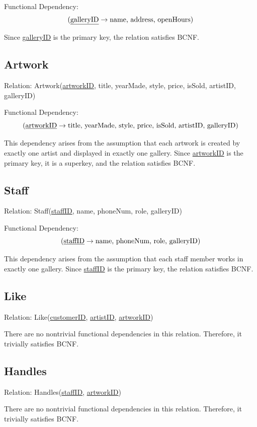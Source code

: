 \documentclass[12pt]{article}
\begin{document}
Functional Dependency:
\[
(\text{\underline{galleryID}} \rightarrow \text{name, address, openHours})
\]

Since \underline{galleryID} is the primary key, the relation satisfies BCNF.

\subsection*{Artwork}
Relation: Artwork(\underline{artworkID}, title, yearMade, style, price, isSold, artistID, galleryID)

Functional Dependency:
\[
(\text{\underline{artworkID}} \rightarrow \text{title, yearMade, style, price, isSold, artistID, galleryID})
\]

This dependency arises from the assumption that each artwork is created by exactly one artist and displayed in exactly one gallery. Since \underline{artworkID} is the primary key, it is a superkey, and the relation satisfies BCNF.

\subsection*{Staff}
Relation: Staff(\underline{staffID}, name, phoneNum, role, galleryID)

Functional Dependency:
\[
(\text{\underline{staffID}} \rightarrow \text{name, phoneNum, role, galleryID})
\]

This dependency arises from the assumption that each staff member works in exactly one gallery. Since \underline{staffID} is the primary key, the relation satisfies BCNF.

\subsection*{Like}
Relation: Like(\underline{customerID}, \underline{artistID}, \underline{artworkID})

There are no nontrivial functional dependencies in this relation. Therefore, it trivially satisfies BCNF.

\subsection*{Handles}
Relation: Handles(\underline{staffID}, \underline{artworkID})

There are no nontrivial functional dependencies in this relation. Therefore, it trivially satisfies BCNF. \\
\end{document}
